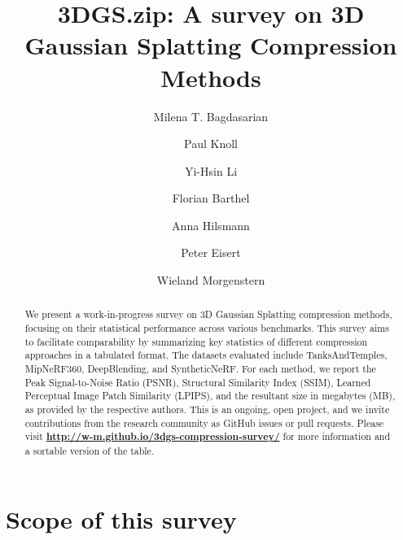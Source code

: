 \documentclass{article}
\title{3DGS.zip: A survey on 3D Gaussian Splatting Compression Methods}
\author[1]{Milena T. Bagdasarian}
\author[1]{Paul Knoll}
\author[3]{Yi-Hsin Li}
\author[1,2]{Florian Barthel}
\author[1]{Anna Hilsmann}
\author[1,2]{Peter Eisert}
\author[1]{Wieland Morgenstern}
\affil[1]{Fraunhofer Heinrich Hertz, HHI}
\affil[2]{Humboldt University of Berlin}
\affil[3]{Technical University Berlin}
\date{}
\begin{document}
\maketitle

\begin{abstract}

    We present a work-in-progress survey on 3D Gaussian Splatting\cite{kerbl3Dgaussians} compression methods, 
    focusing on their statistical performance across various benchmarks. This survey aims 
    to facilitate comparability by summarizing key statistics of different compression 
    approaches in a tabulated format. The datasets evaluated include TanksAndTemples\cite{TanksAndTemples}, 
    MipNeRF360\cite{MipNeRF360}, DeepBlending\cite{DeepBlending}, and SyntheticNeRF\cite{SyntheticNeRF}. For each method, we report the Peak 
    Signal-to-Noise Ratio (PSNR), Structural Similarity Index (SSIM), Learned Perceptual 
    Image Patch Similarity (LPIPS), and the resultant size in megabytes (MB), as 
    provided by the respective authors.
    This is an ongoing, open project, and we invite contributions from the research community 
    as GitHub issues or pull requests. Please visit \mbox{\bfseries\url{http://w-m.github.io/3dgs-compression-survey/}}
    for more information and a sortable version of the table.
    
\end{abstract}


\section{Scope of this survey}
\end{document}
